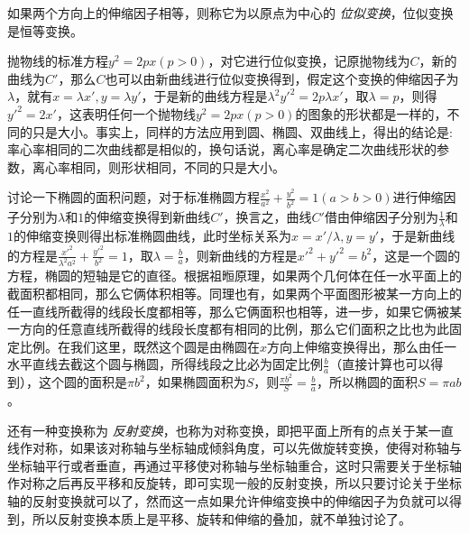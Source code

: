 如果两个方向上的伸缩因子相等，则称它为以原点为中心的 \emph{位似变换}，位似变换是恒等变换。

\begin{example}
  抛物线的标准方程$y^2=2px(p>0)$，对它进行位似变换，记原抛物线为$C$，新的曲线为$C'$，那么$C$也可以由新曲线进行位似变换得到，假定这个变换的伸缩因子为$\lambda$，就有$x=\lambda x', y=\lambda y'$，于是新的曲线方程是$\lambda^2y'^2=2p\lambda x'$，取$\lambda = p$，则得$y'^2=2x'$，这表明任何一个抛物线$y^2=2px(p>0)$的图象的形状都是一样的，不同的只是大小。事实上，同样的方法应用到圆、椭圆、双曲线上，得出的结论是: 率心率相同的二次曲线都是相似的，换句话说，离心率是确定二次曲线形状的参数，离心率相同，则形状相同，不同的只是大小。
\end{example}

\begin{example}
  讨论一下椭圆的面积问题，对于标准椭圆方程$\frac{x^2}{a^2}+\frac{y^2}{b^2}=1(a>b>0)$进行伸缩因子分别为$\lambda$和$1$的伸缩变换得到新曲线$C'$，换言之，曲线$C'$借由伸缩因子分别为$\frac{1}{\lambda}$和$1$的伸缩变换则得出标准椭圆曲线，此时坐标关系为$x=x'/\lambda, y=y'$，于是新曲线的方程是$\frac{x'^2}{\lambda^2a^2}+\frac{y'^2}{b^2}=1$，取$\lambda=\frac{b}{a}$，则新曲线的方程是$x'^2+y'^2=b^2$，这是一个圆的方程，椭圆的短轴是它的直径。根据祖暅原理，如果两个几何体在任一水平面上的截面积都相同，那么它俩体积相等。同理也有，如果两个平面图形被某一方向上的任一直线所截得的线段长度都相等，那么它俩面积也相等，进一步，如果它俩被某一方向的任意直线所截得的线段长度都有相同的比例，那么它们面积之比也为此固定比例。在我们这里，既然这个圆是由椭圆在$x$方向上伸缩变换得出，那么由任一水平直线去截这个圆与椭圆，所得线段之比必为固定比例$\frac{b}{a}$（直接计算也可以得到），这个圆的面积是$\pi b^2$，如果椭圆面积为$S$，则$\frac{\pi b^2}{S}=\frac{b}{a}$，所以椭圆的面积$S=\pi ab$。
\end{example}

还有一种变换称为 \emph{反射变换}，也称为对称变换，即把平面上所有的点关于某一直线作对称，如果该对称轴与坐标轴成倾斜角度，可以先做旋转变换，使得对称轴与坐标轴平行或者垂直，再通过平移使对称轴与坐标轴重合，这时只需要关于坐标轴作对称之后再反平移和反旋转，即可实现一般的反射变换，所以只要讨论关于坐标轴的反射变换就可以了，然而这一点如果允许伸缩变换中的伸缩因子为负就可以得到，所以反射变换本质上是平移、旋转和伸缩的叠加，就不单独讨论了。



